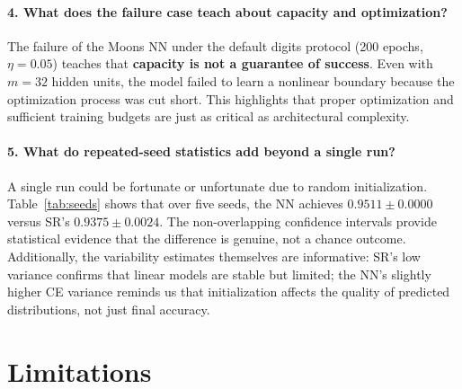 \documentclass[11pt]{article}
\begin{document}
\paragraph{4. What does the failure case teach about capacity and optimization?}
The failure of the Moons NN under the default digits protocol (200 epochs, $\eta=0.05$) teaches that \textbf{capacity is not a guarantee of success}. Even with $m=32$ hidden units, the model failed to learn a nonlinear boundary because the optimization process was cut short. This highlights that proper optimization and sufficient training budgets are just as critical as architectural complexity.

\paragraph{5. What do repeated-seed statistics add beyond a single run?}
A single run could be fortunate or unfortunate due to random initialization.
Table~\ref{tab:seeds} shows that over five seeds, the NN achieves $0.9511 \pm 0.0000$
versus SR's $0.9375 \pm 0.0024$.
The non-overlapping confidence intervals provide statistical evidence that the difference
is genuine, not a chance outcome.
Additionally, the variability estimates themselves are informative: SR's low variance
confirms that linear models are stable but limited; the NN's slightly higher CE variance
reminds us that initialization affects the quality of predicted distributions, not just
final accuracy.


\section{Limitations}
\end{document}
